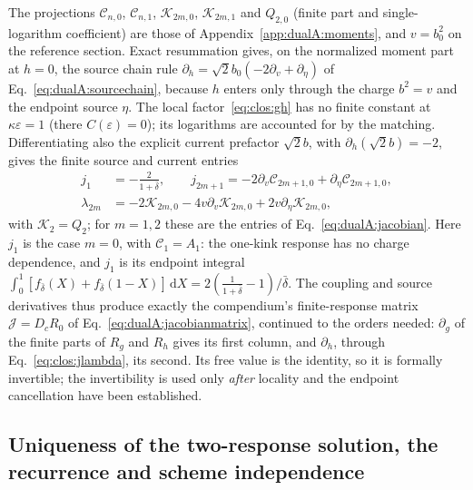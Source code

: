\documentclass[11pt,a4paper]{article}
\numberwithin{equation}{section}
\newcommand{\dd}{\,\mathrm d}
\newcommand{\db}{\bar\delta}
\begin{document}
The projections $\mathcal C_{n,0}$, $\mathcal C_{n,1}$, $\mathcal K_{2m,0}$, $\mathcal K_{2m,1}$ and $Q_{2,0}$ (finite
part and single-logarithm coefficient) are those of Appendix~\ref{app:dualA:moments}, and $v=b_0^2$ on the reference
section. Exact resummation gives, on the normalized moment part at $h=0$, the source chain rule
$\partial_h=\sqrt2b_0(-2\partial_v+\partial_\eta)$ of Eq.~\eqref{eq:dualA:sourcechain}, because $h$ enters only through
the charge $b^2=v$ and the endpoint source $\eta$. The local factor~\eqref{eq:clos:gh} has no
finite constant at $\kappa\varepsilon=1$ (there $C(\varepsilon)=0$); its logarithms are accounted for by the matching.
Differentiating also the explicit current prefactor $\sqrt2b$, with $\partial_h(\sqrt2b)=-2$, gives the finite
source and current entries
\begin{equation}
\begin{aligned}
 j_1&=-\frac2{1+\db},\qquad
 j_{2m+1}=-2\partial_v\mathcal C_{2m+1,0}+\partial_\eta\mathcal C_{2m+1,0},\\
 \lambda_{2m}&=-2\mathcal K_{2m,0}-4v\partial_v\mathcal K_{2m,0}+2v\partial_\eta\mathcal K_{2m,0},
\end{aligned}
 \label{eq:clos:jlambda}
\end{equation}
with $\mathcal K_2=Q_2$; for $m=1,2$ these are the entries of Eq.~\eqref{eq:dualA:jacobian}. Here $j_1$ is the case
$m=0$, with $\mathcal C_1=A_1$: the one-kink response has no charge
dependence, and $j_1$ is its endpoint integral $\int_0^1[f_{\db}(X)+f_{\db}(1-X)]\dd X=2(\frac1{1+\db}-1)/\db$. The
coupling and source derivatives thus produce exactly the compendium's finite-response matrix $\mathcal J=D_cR_0$ of
Eq.~\eqref{eq:dualA:jacobianmatrix}, continued to the orders needed: $\partial_g$ of the finite parts of $R_g$ and $R_h$
gives its first column, and $\partial_h$, through Eq.~\eqref{eq:clos:jlambda}, its second. Its free value is the
identity, so it is formally invertible; the invertibility is used only \emph{after} locality and the endpoint cancellation have
been established.

\subsection{Uniqueness of the two-response solution, the recurrence and scheme independence}\label{app:clos:uniqueness}
\end{document}
